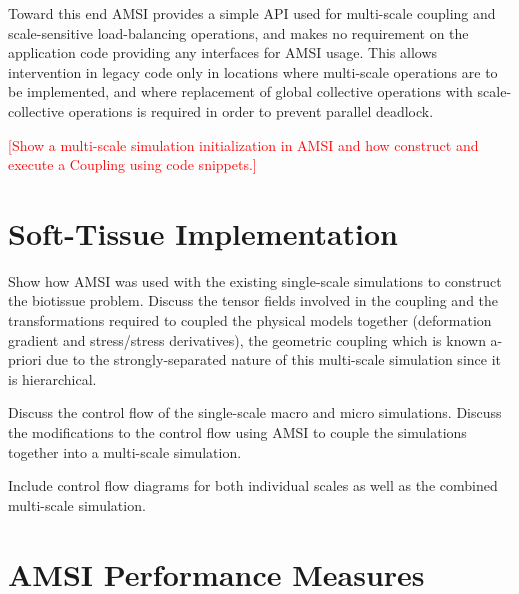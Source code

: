 \documentclass[review]{siamart1116}
\newcommand{\red}[1]{\textcolor{red}{[#1]}}
\begin{document}
Toward this end AMSI provides a simple API used for multi-scale coupling and scale-sensitive load-balancing operations, and makes no requirement on the application code providing any interfaces for AMSI usage. This allows intervention in legacy code only in locations where multi-scale operations are to be implemented, and where replacement of global collective operations with scale-collective operations is required in order to prevent parallel deadlock. 


\red{Show a multi-scale simulation initialization in AMSI and how construct and execute a Coupling using code snippets.}

\section{Soft-Tissue Implementation}\label{sec:bio-implementation}

Show how AMSI was used with the existing single-scale simulations to construct the biotissue problem.
Discuss the tensor fields involved in the coupling and the transformations required to coupled the physical models together (deformation gradient and stress/stress derivatives), the geometric coupling which is known a-priori due to the strongly-separated nature of this multi-scale simulation since it is hierarchical. 

Discuss the control flow of the single-scale macro and micro simulations. Discuss the modifications to the control flow using AMSI to couple the simulations together into a multi-scale simulation.

Include control flow diagrams for both individual scales as well as the combined multi-scale simulation.

\section{AMSI Performance Measures}\label{sec:amsi-metrics}
\end{document}
